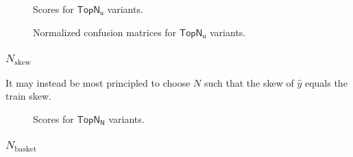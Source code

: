 \documentclass[11pt]{article}
\theoremstyle{definition}
\numberwithin{equation}{section}
\begin{document}
\begin{figure}[t]
\begin{center}
\caption{Scores for $\mathsf{TopN_u}$ variants.}
\label{fig:n-u-scores}
\end{center}
\end{figure}

\begin{figure}[h!]
\begin{center}
\caption{Normalized confusion matrices for $\mathsf{TopN_u}$ variants.}
\label{fig:n-u-confusion}
\end{center}
\end{figure}


    \hypertarget{n_textskew}{%
\subsubsection*{\texorpdfstring{\(N_\text{skew}\)}{N\_\textbackslash{}text\{skew\}}}\label{n_textskew}}

It may instead be most principled to choose \(N\) such that the skew of
$\hat{y}$ equals the train skew.



\begin{figure}[t!]
\begin{center}
\caption{Scores for $\mathsf{TopN_N}$ variants.}
\label{fig:top-n-scores}
\end{center}
\end{figure}





    \hypertarget{n_textbasket}{%
\subsubsection*{\texorpdfstring{\(N_\text{basket}\)}{N\_\textbackslash{}text\{basket\}}}\label{n_textbasket}}
\end{document}
